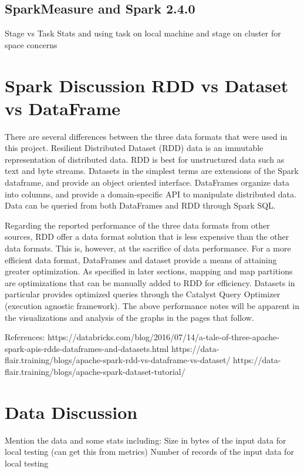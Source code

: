 \documentclass[conference]{IEEEtran}
\begin{document}

\subsection{SparkMeasure and Spark 2.4.0}

Stage vs Task Stats and using task on local machine and stage on cluster for space concerns

\section{Spark Discussion RDD vs Dataset vs DataFrame}


There are several differences between the three data formats that were used in this project.
Resilient Distributed Dataset (RDD) data is an immutable representation of distributed data.
RDD is best for unstructured data such as text and byte streams.
Datasets in the simplest terms are extensions of the Spark dataframe, and provide an object oriented interface.
DataFrames organize data into columns, and provide a domain-specific API to manipulate distributed data.
Data can be queried from both DataFrames and RDD through Spark SQL.

Regarding the reported performance of the three data formats from other sources,
RDD offer a data format solution that is less expensive than the other data formats.
This is, however, at the sacrifice of data performance. For a more efficient data format, DataFrames and dataset provide
a means of attaining greater optimization.
As specified in later sections, mapping and map partitions are optimizations that can be manually added to RDD
for efficiency.
Datasets in particular provides optimized queries through the Catalyst Query Optimizer (execution agnostic framework).
The above performance notes will be apparent in the visualizations and analysis of the graphs in the pages that follow.

References:
https://databricks.com/blog/2016/07/14/a-tale-of-three-apache-spark-apis-rdds-dataframes-and-datasets.html
https://data-flair.training/blogs/apache-spark-rdd-vs-dataframe-vs-dataset/
https://data-flair.training/blogs/apache-spark-dataset-tutorial/

\section{Data Discussion}
Mention the data and some stats including:
Size in bytes of the input data for local testing (can get this from metrics)
Number of records of the input data for local testing
\end{document}
